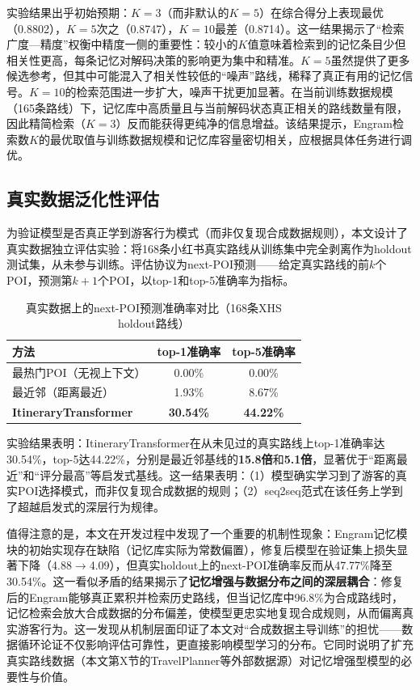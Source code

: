 \documentclass[12pt,a4paper]{ctexart}
\newenvironment{tighttable}
  {\setstretch{1.0}\small}
  {}
\begin{document}
实验结果出乎初始预期：$K=3$（而非默认的$K=5$）在综合得分上表现最优（0.8802），$K=5$次之（0.8747），$K=10$最差（0.8714）。这一结果揭示了“检索广度—精度”权衡中精度一侧的重要性：较小的$K$值意味着检索到的记忆条目少但相关性更高，每条记忆对解码决策的影响更为集中和精准。$K=5$虽然提供了更多候选参考，但其中可能混入了相关性较低的“噪声”路线，稀释了真正有用的记忆信号。$K=10$的检索范围进一步扩大，噪声干扰更加显著。在当前训练数据规模（165条路线）下，记忆库中高质量且与当前解码状态真正相关的路线数量有限，因此精简检索（$K=3$）反而能获得更纯净的信息增益。该结果提示，Engram检索数$K$的最优取值与训练数据规模和记忆库容量密切相关，应根据具体任务进行调优。

\subsection{真实数据泛化性评估}

为验证模型是否真正学到游客行为模式（而非仅复现合成数据规则），本文设计了真实数据独立评估实验：将168条小红书真实路线从训练集中完全剥离作为holdout测试集，从未参与训练。评估协议为next-POI预测——给定真实路线的前$k$个POI，预测第$k+1$个POI，以top-1和top-5准确率为指标。

\begin{table}[H]
\centering
\caption{真实数据上的next-POI预测准确率对比（168条XHS holdout路线）}
\label{tab:real_data_eval}
\begin{tighttable}
\begin{tabular}{lcc}
\toprule
方法 & top-1准确率 & top-5准确率 \\
\midrule
最热门POI（无视上下文） & 0.00\% & 0.00\% \\
最近邻（距离最近） & 1.93\% & 8.67\% \\
\textbf{ItineraryTransformer} & \textbf{30.54\%} & \textbf{44.22\%} \\
\bottomrule
\end{tabular}
\end{tighttable}
\end{table}

实验结果表明：ItineraryTransformer在从未见过的真实路线上top-1准确率达30.54\%，top-5达44.22\%，分别是最近邻基线的\textbf{15.8倍}和\textbf{5.1倍}，显著优于“距离最近”和“评分最高”等启发式基线。这一结果表明：（1）模型确实学习到了游客的真实POI选择模式，而非仅复现合成数据的规则；（2）seq2seq范式在该任务上学到了超越启发式的深层行为规律。

值得注意的是，本文在开发过程中发现了一个重要的机制性现象：Engram记忆模块的初始实现存在缺陷（记忆库实际为常数偏置），修复后模型在验证集上损失显著下降（4.88$\to$4.09），但真实holdout上的next-POI准确率反而从47.77\%降至30.54\%。这一看似矛盾的结果揭示了\textbf{记忆增强与数据分布之间的深层耦合}：修复后的Engram能够真正累积并检索历史路线，但当记忆库中96.8\%为合成路线时，记忆检索会放大合成数据的分布偏差，使模型更忠实地复现合成规则，从而偏离真实游客行为。这一发现从机制层面印证了本文对“合成数据主导训练”的担忧——数据循环论证不仅影响评估可靠性，更直接影响模型学习的分布。它同时说明了扩充真实路线数据（本文第X节的TravelPlanner等外部数据源）对记忆增强型模型的必要性与价值。
\end{document}
